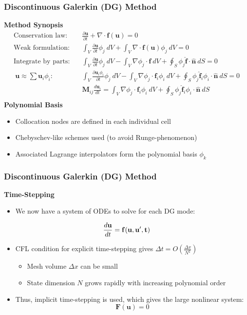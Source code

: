\documentclass[9pt]{beamer}
\newcommand{\bv}[1]{\mathbf{#1}}
\newcommand{\diff}[2]{\frac{\partial #1}{\partial #2}}
\newcommand{\beqq}[0]{\begin{equation*}}
\newcommand{\eeqq}[0]{\end{equation*}}
\begin{document}
\begin{frame}
\frametitle{Discontinuous Galerkin (DG) Method}
\label{sec-6-2}

\textbf{Method Synopsis}
\beqq
\begin{aligned}
\text{Conservation law:}\quad & \diff{\bv{u}}{t} + \nabla \cdot \bv{f}(\bv{u}) = 0 \\
\text{Weak formulation:}\quad & \int_V \diff{\bv{u}}{t} \phi_j \ dV + \int_V  \nabla \cdot \bv{f}(\bv{u})\phi_j\ dV = 0 \\
\text{Integrate by parts:}\quad & \int_V \diff{\bv{u}}{t} \phi_j\ dV - \int_V \nabla \phi_j \cdot \bv{f}\ dV + \oint_S \phi_j \bv{\hat{f}} \cdot \bv{\hat{n}}\ dS = 0 \\
\ \bv{u}\approx \sum \bv{u}_i \phi_i\text{:}\quad & \int_V \diff{\bv{u}_i \phi_i}{t} \phi_j\ dV - \int_V \nabla \phi_j \cdot \bv{f}_i \phi_i\ dV + \oint_S \phi_j \bv{\hat{f}}_i \phi_i \cdot \bv{\hat{n}}\ dS = 0 \\
\text{}\quad & \bv{M}_{ij} \frac{d\bv{u}_i}{dt} = \int_V \nabla \phi_j \cdot \bv{f}_i \phi_i\ dV + \oint_S \phi_j \bv{\hat{f}}_i \phi_i \cdot \bv{\hat{n}}\ dS \\
\end{aligned}
\eeqq
\textbf{Polynomial Basis}
\begin{itemize}
\item Collocation nodes are defined in each individual cell
\item Chebyschev-like schemes used (to avoid Runge-phenomenon)
\item Associated Lagrange interpolators form the polynomial basis ${\phi_k}$
\end{itemize}
\end{frame}
\begin{frame}
\frametitle{Discontinuous Galerkin (DG) Method}
\label{sec-6-3}

\textbf{Time-Stepping}
\begin{itemize}
\item We now have a system of ODEs to solve for each DG mode:
\end{itemize}
$$\frac{d\bv{u}}{dt} = \bf{f}(\bf{u,u',t})$$
\begin{itemize}
\item CFL condition for explicit time-stepping gives $\Delta t = O(\frac{\Delta x}{N^2})$
\begin{itemize}
\item Mesh volume $\Delta x$ can be small
\item State dimension $N$ grows rapidly with increasing polynomial order
\end{itemize}
\item Thus, implicit time-stepping is used, which gives the large nonlinear system:
  $$\bv{F}(\bv{u}) = 0$$
\end{itemize}
\end{frame}
\end{document}
